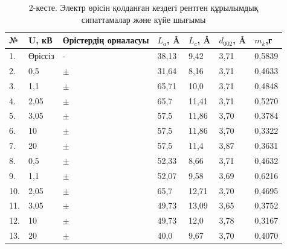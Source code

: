\begin{table}[H]
\caption*{2-кесте. Электр өрісін қолданған кездегі рентген құрылымдық сипаттамалар және күйе шығымы}
\centering
\begin{tabular}{|l|l|l|l|l|l|l|}
\hline
№ & U, кВ & Өрістердің орналасуы & $L_a$, Å & $L_c$, Å & $d_{002}$, Å & $m_k$,г \\ \hline
1. & Өріссіз & - & 38,13 & 9,42 & 3,71 & 0,5839 \\ \hline
2. & 0,5 & $\pm$ & 31,64 & 8,16 & 3,71 & 0,4633 \\ \hline
3. & 1,1 & $\pm$ & 65,71 & 10,0 & 3,71 & 0,4848 \\ \hline
4. & 2,05 & $\pm$ & 65,7 & 11,41 & 3,71 & 0,5270 \\ \hline
5. & 3,05 & $\pm$ & 57,5 & 11,86 & 3,70 & 0,3784 \\ \hline
6. & 10 & $\pm$ & 57,5 & 11,86 & 3,70 & 0,3322 \\ \hline
7. & 20 & $\pm$ & 57,5 & 11,4 & 3,87 & 0,3631 \\ \hline
8. & 0,5 & $\pm$ & 52,33 & 8,66 & 3,71 & 0,4632 \\ \hline
9. & 1,1 & $\pm$ & 52,07 & 9,58 & 3,69 & 0,6216 \\ \hline
10. & 2,05 & $\pm$ & 65,7 & 12,71 & 3,70 & 0,4695 \\ \hline
11. & 3,05 & $\pm$ & 49,73 & 13,09 & 3,65 & 0,3752 \\ \hline
12. & 10 & $\pm$ & 49,73 & 12,0 & 3,78 & 0,3167 \\ \hline
13. & 20 & $\pm$ & 40,0 & 9,67 & 3,70 & 0,4070 \\ \hline
\end{tabular}
\end{table}

